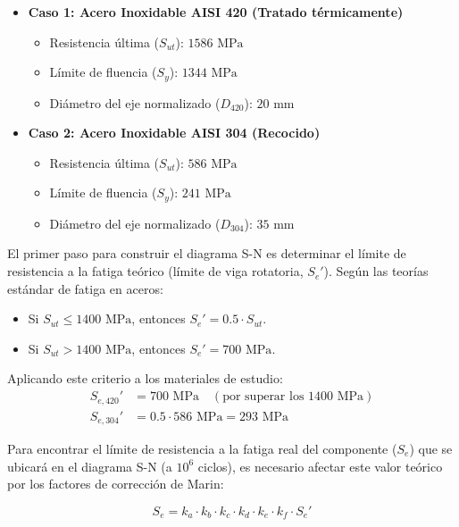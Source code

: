 \documentclass[12pt, a4paper]{article}
\begin{document}
\begin{itemize}
    \item \textbf{Caso 1: Acero Inoxidable AISI 420 (Tratado térmicamente)}
    \begin{itemize}
        \item Resistencia última ($S_{ut}$): $1586 \text{ MPa}$
        \item Límite de fluencia ($S_y$): $1344 \text{ MPa}$
        \item Diámetro del eje normalizado ($D_{420}$): $20 \text{ mm}$
    \end{itemize}

    \item \textbf{Caso 2: Acero Inoxidable AISI 304 (Recocido)}
    \begin{itemize}
        \item Resistencia última ($S_{ut}$): $586 \text{ MPa}$
        \item Límite de fluencia ($S_y$): $241 \text{ MPa}$
        \item Diámetro del eje normalizado ($D_{304}$): $35 \text{ mm}$
    \end{itemize}
\end{itemize}

El primer paso para construir el diagrama S-N es determinar el límite de resistencia a la fatiga teórico (límite de viga rotatoria, $S_e'$). Según las teorías estándar de fatiga en aceros:
\begin{itemize}
    \item Si $S_{ut} \leq 1400 \text{ MPa}$, entonces $S_e' = 0.5 \cdot S_{ut}$.
    \item Si $S_{ut} > 1400 \text{ MPa}$, entonces $S_e' = 700 \text{ MPa}$.
\end{itemize}

Aplicando este criterio a los materiales de estudio:
\begin{align}
    S_{e,420}' &= 700 \text{ MPa} \quad (\text{por superar los } 1400 \text{ MPa}) \\[6pt]
    S_{e,304}' &= 0.5 \cdot 586 \text{ MPa} = 293 \text{ MPa}
\end{align}

Para encontrar el límite de resistencia a la fatiga real del componente ($S_e$) que se ubicará en el diagrama S-N (a $10^6$ ciclos), es necesario afectar este valor teórico por los factores de corrección de Marin:

\begin{equation}
    S_e = k_a \cdot k_b \cdot k_c \cdot k_d \cdot k_e \cdot k_f \cdot S_e'
\end{equation}
\end{document}
